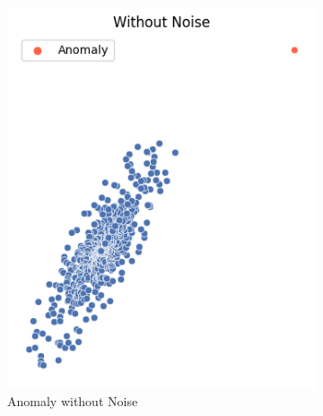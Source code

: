 \documentclass[a4paper,12pt]{report}
\theoremstyle{definitionNODot}
\begin{document}
	\begin{figure}[h]
		\begin{subfigure}[b]{0.49\textwidth}
			\centering
			\includegraphics[width=\textwidth]{anomaly_vs_noise_clear_outlier.png}
			\caption{Anomaly without Noise}
			\label{fig:anomaly without noise}
		\end{subfigure}
		\hfill
		\begin{subfigure}[b]{0.49\textwidth}
			\centering

\end{subfigure}
\end{figure}
\end{document}

